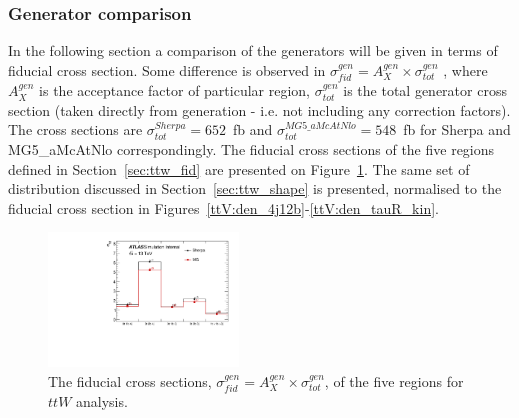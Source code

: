%
%
%
%
%
\subsubsection{Generator comparison}
\label{sec:ttw_gen}

In the following section a comparison of the generators will be given in terms of fiducial cross section. Some difference is observed in $\sigma_{fid}^{gen}=A_X^{gen}\times \sigma_{tot}^{gen}$ , where $A_X^{gen}$ is the acceptance factor of particular region, $\sigma_{tot}^{gen}$ is the total generator cross section (taken directly from generation - i.e. not including any correction factors). The cross sections are $\sigma_{tot}^{Sherpa}=652$~fb and $\sigma_{tot}^{MG5\_aMcAtNlo}=548$~fb for Sherpa and MG5\_aMcAtNlo correspondingly. The fiducial cross sections of the five regions defined in Section~\ref{sec:ttw_fid} are presented on Figure~\ref{ttV:fid_xs}.
The same set of distribution discussed in Section~\ref{sec:ttw_shape} is presented, normalised to the fiducial cross section in Figures~\ref{ttV:den_4j12b}-\ref{ttV:den_tauR_kin}.

\begin{figure}[!htb]
\centering
\includegraphics[width=0.45\textwidth]{Plots/ttV/generator/acc_7f}
  \caption{The fiducial cross sections, $\sigma_{fid}^{gen}=A_X^{gen}\times \sigma_{tot}^{gen}$,  of the five regions for $ttW$ analysis. \label{ttV:fid_xs}}
\end{figure}


